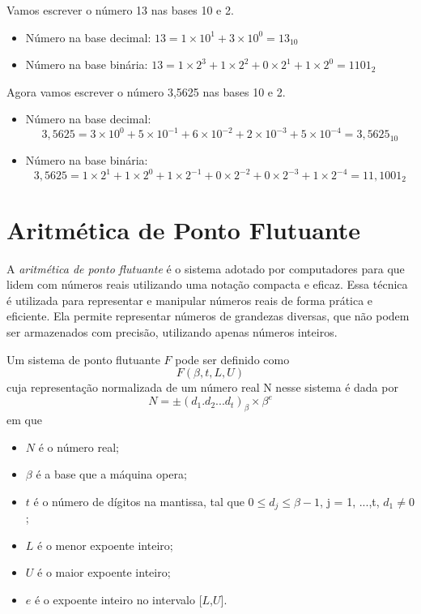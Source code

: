 \begin{ex}
Vamos escrever o número 13 nas bases 10 e 2.
\begin{itemize}
    \item Número na base decimal: $ 13 = 1 \times 10^1 + 3 \times 10^0 = 13_{10}$
    \item Número na base binária: $ 13 = 1 \times 2^3 + 1 \times 2^2 + 0  \times 2^1 + 1 \times 2^0  = 1101_2$
\end{itemize}
\end{ex}

\begin{ex}
Agora vamos escrever o número 3,5625 nas bases 10 e 2.

\begin{itemize}
    \item Número na base decimal: 
    \[
    3{,}5625 = 3 \times 10^0 + 5 \times 10^{-1} + 6 \times 10^{-2} + 2 \times 10^{-3} + 5 \times 10^{-4} = 3{,}5625_{10}
    \]
    
    \item Número na base binária:
    \[
    3{,}5625 = 1\times 2^{1} + 1 \times 2^0 + 1 \times 2^{-1} + 0 \times 2^{-2} + 0 \times 2^{-3} + 1 \times 2^{-4} = 11{,}1001_2
    \]
\end{itemize}
\end{ex}

\section{Aritmética de Ponto Flutuante}

A \textit{aritmética de ponto flutuante} é o sistema adotado por computadores para que lidem com números reais utilizando uma notação compacta e eficaz. Essa técnica é utilizada para representar e manipular números reais de forma prática e eficiente. Ela permite representar números de grandezas diversas, que não podem ser armazenados com precisão, utilizando apenas números inteiros.


Um sistema de ponto flutuante $F$ pode ser definido como
\[
F(\beta, t, L, U)\]
cuja representação normalizada de um número real N nesse sistema é dada por
\begin{equation}
N = \pm (d_{1}.d_{2} . . . d_{t})_\beta \times \beta^e 
\end{equation}
em que
\begin{itemize}
  \item \( N \) é o número real;
  \item \(\beta\) é a base que a máquina opera;
  \item \( t \) é o número de dígitos na mantissa, tal que \( 0 \leq d_{j} \leq \beta-1 \), j = 1, ...,t, \(d_{1} \neq 0\);
  \item \( L \) é o menor expoente inteiro;
  \item \( U \) é o maior expoente inteiro;
  \item \( e \) é o expoente inteiro no intervalo [\( L \),\( U \)].
\end{itemize}

